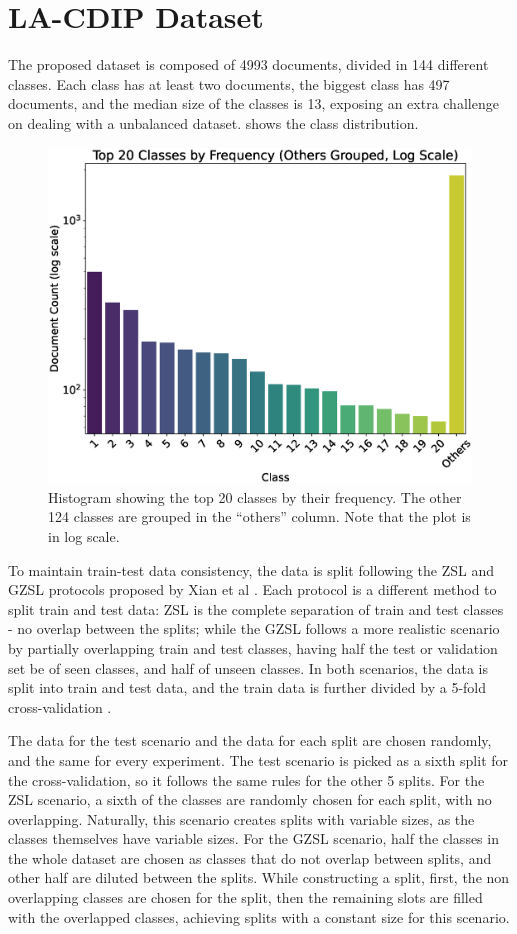 \section{LA-CDIP Dataset}
\label{sec:dataset}

The proposed dataset is composed of 4993 documents, divided in 144 different classes. Each class has at least two documents, the biggest class has 497 documents, and the median size of the classes is 13, exposing an extra challenge on dealing with a unbalanced dataset.  shows the class distribution.

\begin{figure}[htbp]
\centering
\includegraphics[width=.8\textwidth]{images/hist2.eps}
\caption{Histogram showing the top 20 classes by their frequency. The other 124 classes are grouped in the ``others'' column. Note that the plot is in log scale.}
\label{fig:histplot}
\end{figure}  

To maintain train-test data consistency, the data is split following the \gls{ZSL} and \gls{GZSL} protocols proposed by Xian et al \cite{gzsl}. Each protocol is a different method to split train and test data: \gls{ZSL} is the complete separation of train and test classes - no overlap between the splits; while the \gls{GZSL} follows a more realistic scenario by partially overlapping train and test classes, having half the test or validation set be of seen classes, and half of unseen classes. In both scenarios, the data is split into train and test data, and the train data is further divided by a 5-fold cross-validation \cite{kfoldcv}.

The data for the test scenario and the data for each split are chosen randomly, and the same for every experiment. The test scenario is picked as a sixth split for the cross-validation, so it follows the same rules for the other 5 splits. For the \gls{ZSL} scenario, a sixth of the classes are randomly chosen for each split, with no overlapping. Naturally, this scenario creates splits with variable sizes, as the classes themselves have variable sizes. For the \gls{GZSL} scenario, half the classes in the whole dataset are chosen as classes that do not overlap between splits, and other half are diluted between the splits. While constructing a split, first, the non overlapping classes are chosen for the split, then the remaining slots are filled with the overlapped classes, achieving splits with a constant size for this scenario.

